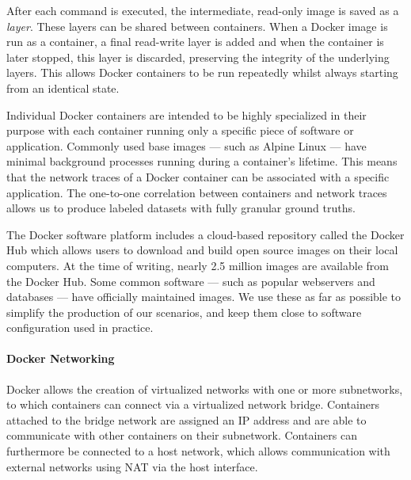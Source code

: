 After each command is executed, the intermediate, read-only image is saved as a \textit{layer}. These layers can be shared between containers. When a Docker image is run as a container, a final read-write layer is added and when the container is later stopped, this layer is discarded, preserving the integrity of the underlying layers. This allows Docker containers to be run repeatedly whilst always starting from an identical state. 


Individual Docker containers are intended to be highly specialized in their purpose with each container running only a specific piece of software or application. Commonly used base images --- such as Alpine Linux --- have minimal background processes running during a container's lifetime. This means that the network traces of a Docker container can be associated with a specific application. The one-to-one correlation between containers and network traces allows us to produce labeled datasets with fully granular ground truths.

The Docker software platform includes a cloud-based repository called the Docker Hub \cite{dockerhub} which allows users to download and build open source images on their local computers. At the time of writing, nearly 2.5 million images are available from the Docker Hub. Some common software --- such as popular webservers and databases --- have officially maintained images. We use these as far as possible to simplify the production of our scenarios, and keep them close to software configuration used in practice.


\paragraph*{Docker Networking} 
\label{sec:network}
Docker allows the creation of virtualized networks with one or more subnetworks, to which containers can connect via a virtualized network bridge. Containers attached to the bridge network are assigned an IP address and are able to communicate with other containers on their subnetwork. Containers can furthermore be connected to a host network, which allows communication with external networks using NAT via the host interface.

